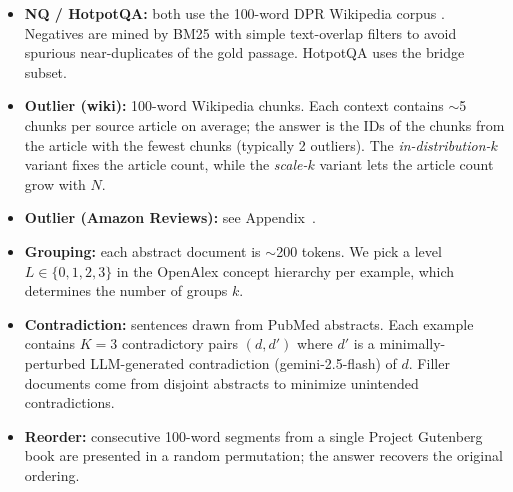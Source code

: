 \begin{itemize}
\item \textbf{NQ / HotpotQA:} both use the 100-word DPR Wikipedia corpus \citep{Karpukhin2020DensePR}. Negatives are mined by BM25 with simple text-overlap filters to avoid spurious near-duplicates of the gold passage. HotpotQA uses the bridge subset. 
\item \textbf{Outlier (wiki):} 100-word Wikipedia chunks. Each context contains $\sim$5 chunks per source article on average; the answer is the IDs of the chunks from the article with the fewest chunks (typically 2 outliers). The \emph{in-distribution-$k$} variant fixes the article count, while the \emph{scale-$k$} variant lets the article count grow with $N$.
\item \textbf{Outlier (Amazon Reviews):} see Appendix~\claude{\ref{app:data-details}}.
\item \textbf{Grouping:} each abstract document is $\sim$200 tokens. We pick a level $L\in\{0,1,2,3\}$ in the OpenAlex concept hierarchy per example, which determines the number of groups $k$.
\item \textbf{Contradiction:} sentences drawn from PubMed abstracts. Each example contains $K{=}3$ contradictory pairs $(d, d')$ where $d'$ is a minimally-perturbed LLM-generated contradiction (gemini-2.5-flash) of $d$. Filler documents come from disjoint abstracts to minimize unintended contradictions.
\item \textbf{Reorder:} consecutive 100-word segments from a single Project Gutenberg book are presented in a random permutation; the answer recovers the original ordering.
\end{itemize}
